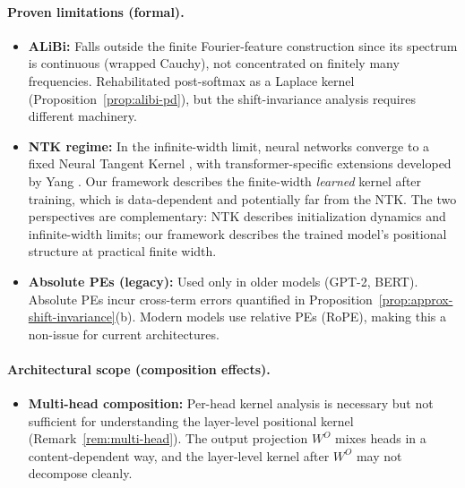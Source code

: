 \documentclass[11pt]{article}
\theoremstyle{definition}
\begin{document}
\paragraph{Proven limitations (formal).}
\begin{itemize}
    \item \textbf{ALiBi:} Falls outside the finite Fourier-feature construction since its spectrum is continuous (wrapped Cauchy), not concentrated on finitely many frequencies. Rehabilitated post-softmax as a Laplace kernel (Proposition~\ref{prop:alibi-pd}), but the shift-invariance analysis requires different machinery.
    \item \textbf{NTK regime:} In the infinite-width limit, neural networks converge to a fixed Neural Tangent Kernel \cite{jacot2018ntk}, with transformer-specific extensions developed by Yang \cite{yang2020ntk}. Our framework describes the finite-width \emph{learned} kernel after training, which is data-dependent and potentially far from the NTK. The two perspectives are complementary: NTK describes initialization dynamics and infinite-width limits; our framework describes the trained model's positional structure at practical finite width.
    \item \textbf{Absolute PEs (legacy):} Used only in older models (GPT-2, BERT). Absolute PEs incur cross-term errors quantified in Proposition~\ref{prop:approx-shift-invariance}(b). Modern models use relative PEs (RoPE), making this a non-issue for current architectures.
\end{itemize}

\paragraph{Architectural scope (composition effects).}
\begin{itemize}
    \item \textbf{Multi-head composition:} Per-head kernel analysis is necessary but not sufficient for understanding the layer-level positional kernel (Remark~\ref{rem:multi-head}). The output projection $W^O$ mixes heads in a content-dependent way, and the layer-level kernel after $W^O$ may not decompose cleanly.
\end{itemize}
\end{document}

